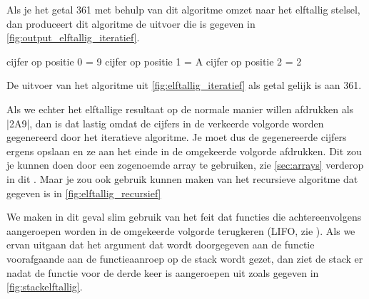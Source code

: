 
Als je het getal 361 met behulp van dit algoritme omzet naar het elftallig stelsel, dan produceert dit algoritme de uitvoer die is gegeven in \cref{fig:output_elftallig_iteratief}. 

\begin{myFigure}[!htbp]
	\centering%
	\begin{coutput}
cijfer op positie 0 = 9
cijfer op positie 1 = A
cijfer op positie 2 = 2
	\end{coutput}
	\caption{De uitvoer van het algoritme uit \cref{fig:elftallig_iteratief} als getal gelijk is aan 361.}
	\label{fig:output_elftallig_iteratief}
\end{myFigure}

Als we echter het elftallige resultaat op de normale manier willen afdrukken als |2A9|, dan is dat lastig omdat de cijfers in de verkeerde volgorde worden gegenereerd door het iteratieve algoritme.
Je moet dus de gegenereerde cijfers ergens opslaan en ze aan het einde in de omgekeerde volgorde afdrukken.
Dit zou je kunnen doen door een zogenoemde array te gebruiken, zie \cref{sec:arrays} verderop in dit \MakeLowercase\documenttype{}. 
Maar je zou ook gebruik kunnen maken van het recursieve algoritme dat gegeven is in \cref{fig:elftallig_recursief}
 

\newcommand{\printInElftalligStelsel}{\hcode{print\\-In\\-Elf\\-tal\\-lig\\-Stel\\-sel}}

We maken in dit geval slim gebruik van het feit dat functies die achtereenvolgens aangeroepen worden in de omgekeerde volgorde terugkeren (LIFO, zie ).
Als we ervan uitgaan dat het argument dat wordt doorgegeven aan de functie \printInElftalligStelsel{} voorafgaande aan de functieaanroep op de stack wordt gezet, dan ziet de stack er nadat de functie voor de derde keer is aangeroepen uit zoals gegeven in \cref{fig:stackelftallig}.


